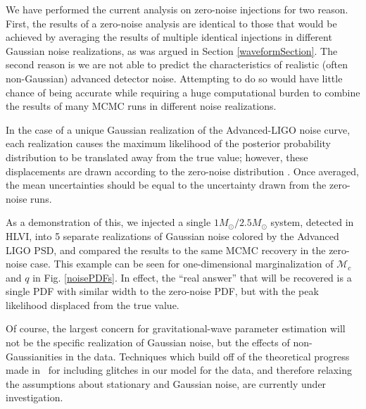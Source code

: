 \documentclass[11pt,a4paper]{emulateapj} 
\newcommand{\chmass}{\mathcal{M}_c}
\begin{document}
  

We have performed the current analysis on zero-noise injections for
two reason.  First, the results of a zero-noise analysis are identical
to those that would be achieved by averaging the results of multiple
identical injections in different Gaussian noise realizations, as was
argued in Section \ref{waveformSection}.  The second reason is we are
not able to predict the characteristics of realistic (often
non-Gaussian) advanced detector noise.  Attempting to do so would have
little chance of being accurate while requiring a huge computational
burden to combine the results of many MCMC runs in different noise
realizations.

 In the case of a unique Gaussian realization of the Advanced-LIGO
 noise curve, each realization causes the maximum likelihood of the
 posterior probability distribution to be translated away from the
 true value; however, these displacements are drawn according to the
 zero-noise distribution \citep{Inadequacies}.  Once averaged, the
 mean uncertainties should be equal to the uncertainty drawn from the
 zero-noise runs.

As a demonstration of this, we injected a single
$1M_{\odot}/2.5M_{\odot}$ system, detected in HLVI, into 5 separate
realizations of Gaussian noise colored by the Advanced LIGO PSD, and
compared the results to the same MCMC recovery in the zero-noise case.
This example can be seen for one-dimensional marginalization of
$\chmass$ and $q$ in Fig. \ref{noisePDFs}.  In effect, the ``real
answer'' that will be recovered is a single PDF with similar width to
the zero-noise PDF, but with the peak likelihood displaced from the
true value.

Of course, the largest concern for gravitational-wave parameter
estimation will not be the specific realization of Gaussian noise, but
the effects of non-Gaussianities in the data.  Techniques which build
off of the theoretical progress made
in~\cite{Allen:2002jw,Rover:2011qd,Littenberg:2010gf} for including
glitches in our model for the data, and therefore relaxing the
assumptions about stationary and Gaussian noise, are currently under
investigation.
\end{document}
